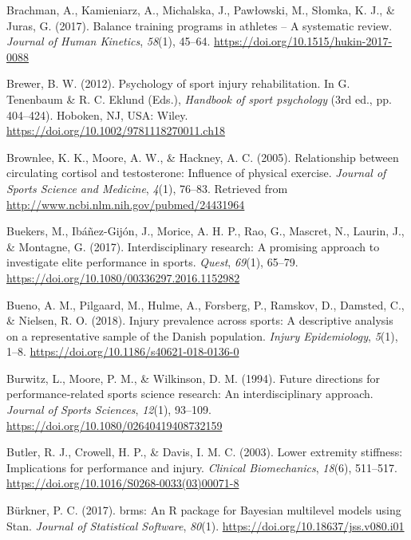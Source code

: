 \documentclass[
  english,
  man,floatsintext]{apa6}
\begin{document}
\leavevmode\hypertarget{ref-Brachman2017}{}%
Brachman, A., Kamieniarz, A., Michalska, J., Pawłowski, M., Słomka, K. J., \& Juras, G. (2017). Balance training programs in athletes -- A systematic review. \emph{Journal of Human Kinetics}, \emph{58}(1), 45--64. \url{https://doi.org/10.1515/hukin-2017-0088}

\leavevmode\hypertarget{ref-Brewer2012}{}%
Brewer, B. W. (2012). Psychology of sport injury rehabilitation. In G. Tenenbaum \& R. C. Eklund (Eds.), \emph{Handbook of sport psychology} (3rd ed., pp. 404--424). Hoboken, NJ, USA: Wiley. \url{https://doi.org/10.1002/9781118270011.ch18}

\leavevmode\hypertarget{ref-Brownlee2005}{}%
Brownlee, K. K., Moore, A. W., \& Hackney, A. C. (2005). Relationship between circulating cortisol and testosterone: Influence of physical exercise. \emph{Journal of Sports Science and Medicine}, \emph{4}(1), 76--83. Retrieved from \url{http://www.ncbi.nlm.nih.gov/pubmed/24431964}

\leavevmode\hypertarget{ref-Buekers2017}{}%
Buekers, M., Ibáñez-Gijón, J., Morice, A. H. P., Rao, G., Mascret, N., Laurin, J., \& Montagne, G. (2017). Interdisciplinary research: A promising approach to investigate elite performance in sports. \emph{Quest}, \emph{69}(1), 65--79. \url{https://doi.org/10.1080/00336297.2016.1152982}

\leavevmode\hypertarget{ref-Bueno2018}{}%
Bueno, A. M., Pilgaard, M., Hulme, A., Forsberg, P., Ramskov, D., Damsted, C., \& Nielsen, R. O. (2018). Injury prevalence across sports: A descriptive analysis on a representative sample of the Danish population. \emph{Injury Epidemiology}, \emph{5}(1), 1--8. \url{https://doi.org/10.1186/s40621-018-0136-0}

\leavevmode\hypertarget{ref-Burwitz1994}{}%
Burwitz, L., Moore, P. M., \& Wilkinson, D. M. (1994). Future directions for performance‐related sports science research: An interdisciplinary approach. \emph{Journal of Sports Sciences}, \emph{12}(1), 93--109. \url{https://doi.org/10.1080/02640419408732159}

\leavevmode\hypertarget{ref-Butler2003}{}%
Butler, R. J., Crowell, H. P., \& Davis, I. M. C. (2003). Lower extremity stiffness: Implications for performance and injury. \emph{Clinical Biomechanics}, \emph{18}(6), 511--517. \url{https://doi.org/10.1016/S0268-0033(03)00071-8}

\leavevmode\hypertarget{ref-Burkner2017a}{}%
Bürkner, P. C. (2017). brms: An R package for Bayesian multilevel models using Stan. \emph{Journal of Statistical Software}, \emph{80}(1). \url{https://doi.org/10.18637/jss.v080.i01}
\end{document}
